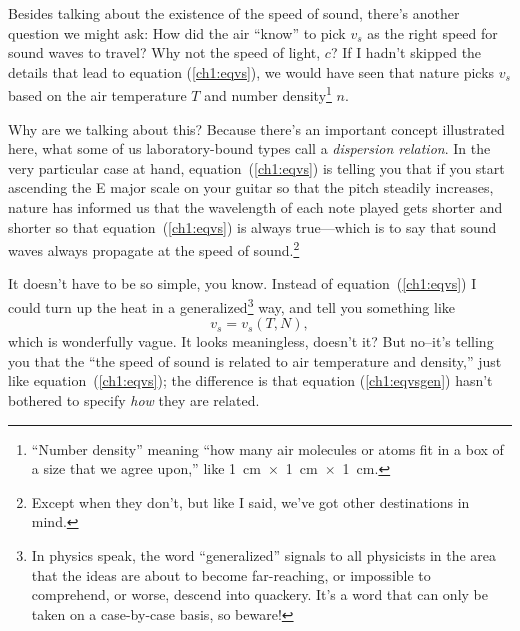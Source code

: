 Besides talking about the existence of the speed of sound, there's
another question we might ask: How did the air ``know'' to pick $v_s$
as the right speed for sound waves to travel? Why not the speed of
light, $c$? If I hadn't skipped the details that lead to equation
(\ref{ch1:eqvs}), we would have seen that nature picks $v_s$ based on
the air temperature $T$ and number density\footnote{``Number density''
  meaning ``how many air molecules or atoms fit in a box of a size
  that we agree upon,'' like 1~cm~$\times$~1~cm~$\times$~1~cm.} $n$.

Why are we talking about this? Because there's an important concept
illustrated here, what some of us laboratory-bound types call a
\emph{dispersion relation}. In the very particular case at hand,
equation~(\ref{ch1:eqvs}) is telling you that if you start ascending
the E major scale on your guitar so that the pitch steadily increases,
nature has informed us that the wavelength of each note played gets
shorter and shorter so that equation~(\ref{ch1:eqvs}) is always
true---which is to say that sound waves always propagate at the speed
of sound.\footnote{Except when they don't, but like I said, we've got
  other destinations in mind.}

It doesn't have to be so simple, you know. Instead of
equation~(\ref{ch1:eqvs}) I could turn up the heat in a
generalized\footnote{In physics speak, the word ``generalized''
  signals to all physicists in the area that the ideas are about to
  become far-reaching, or impossible to comprehend, or worse, descend
  into quackery. It's a word that can only be taken on a case-by-case
  basis, so beware!}  way, and tell you something like
\begin{equation}
  \label{ch1:eqvsgen}
  v_s = v_s (T, N),
\end{equation}
which is wonderfully vague. It looks meaningless, doesn't it? But
no--it's telling you that the ``the speed of sound is related to air
temperature and density,'' just like equation~(\ref{ch1:eqvs}); the
difference is that equation (\ref{ch1:eqvsgen}) hasn't bothered to
specify \emph{how} they are related. 

